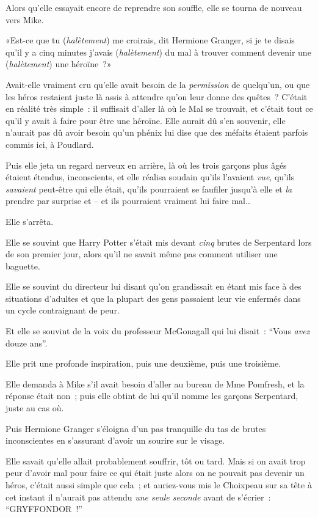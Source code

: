 Alors qu'elle essayait encore de reprendre son souffle, elle se tourna de nouveau vers Mike.

«Est-ce que tu (\emph{halètement}) me croirais, dit Hermione Granger, si je te disais qu'il y a cinq minutes j'avais (\emph{halètement}) du mal à trouver comment devenir une (\emph{halètement}) une héroïne~?»

Avait-elle vraiment cru qu'elle avait besoin de la \emph{permission} de quelqu'un, ou que les héros restaient juste là assis à attendre qu'on leur donne des quêtes~? C'était en réalité très simple~: il suffisait d'aller là où le Mal se trouvait, et c'était tout ce qu'il y avait à faire pour être une héroïne. Elle aurait dû s'en souvenir, elle n'aurait pas dû avoir besoin qu'un phénix lui dise que des méfaits étaient parfois commis ici, à Poudlard.

Puis elle jeta un regard nerveux en arrière, là où les trois garçons plus âgés étaient étendus, inconscients, et elle réalisa soudain qu'ils l'avaient \emph{vue}, qu'ils \emph{savaient} peut-être qui elle était, qu'ils pourraient se faufiler jusqu'à elle et \emph{la} prendre par surprise et -- et ils pourraient vraiment lui faire mal…

Elle s'arrêta.

Elle se souvint que Harry Potter s'était mis devant \emph{cinq} brutes de Serpentard lors de son premier jour, alors qu'il ne savait même pas comment utiliser une baguette.

Elle se souvint du directeur lui disant qu'on grandissait en étant mis face à des situations d'adultes et que la plupart des gens passaient leur vie enfermés dans un cycle contraignant de peur.

Et elle se souvint de la voix du professeur McGonagall qui lui disait~: “Vous \emph{avez} douze ans”.

Elle prit une profonde inspiration, puis une deuxième, puis une troisième.

Elle demanda à Mike s'il avait besoin d'aller au bureau de Mme Pomfresh, et la réponse était non~; puis elle obtint de lui qu'il nomme les garçons Serpentard, juste au cas où.

Puis Hermione Granger s'éloigna d'un pas tranquille du tas de brutes inconscientes en s'assurant d'avoir un sourire sur le visage.

Elle savait qu'elle allait probablement souffrir, tôt ou tard. Mais si on avait trop peur d'avoir mal pour faire ce qui était juste alors on ne pouvait pas devenir un héros, c'était aussi simple que cela~; et auriez-vous mis le Choixpeau sur sa tête à cet instant il n'aurait pas attendu \emph{une seule seconde} avant de s'écrier~: “GRYFFONDOR~!”

